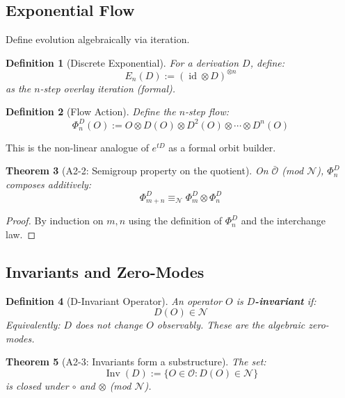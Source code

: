 \documentclass[12pt, oneside]{article}
\newtheorem{theorem}{Theorem}[section]
\newtheorem{definition}[theorem]{Definition}
\DeclareMathOperator{\id}{id}
\DeclareMathOperator{\Inv}{Inv}
\newcommand{\N}{\mathcal{N}}
\newcommand{\Opr}{\mathcal{O}}
\newcommand{\Osh}{\bar{\mathcal{O}}}
\begin{document}
\subsection{Exponential Flow}

Define evolution algebraically via iteration.

\begin{definition}[Discrete Exponential]
For a derivation $D$, define:
\begin{equation}
E_n(D) := (\id \otimes D)^{\otimes n}
\end{equation}
as the $n$-step overlay iteration (formal).
\end{definition}

\begin{definition}[Flow Action]
Define the $n$-step flow:
\begin{equation}
\Phi_n^D(O) := O \otimes D(O) \otimes D^2(O) \otimes \cdots \otimes D^n(O)
\end{equation}
\end{definition}

This is the non-linear analogue of $e^{tD}$ as a formal orbit builder.

\begin{theorem}[A2-2: Semigroup property on the quotient]
On $\Osh$ (mod $\N$), $\Phi_n^D$ composes additively:
\begin{equation}
\Phi_{m+n}^D \equiv_\N \Phi_m^D \otimes \Phi_n^D
\end{equation}
\end{theorem}

\begin{proof}
By induction on $m, n$ using the definition of $\Phi_n^D$ and the interchange law.
\end{proof}

\subsection{Invariants and Zero-Modes}

\begin{definition}[D-Invariant Operator]
An operator $O$ is \textbf{$D$-invariant} if:
\begin{equation}
D(O) \in \N
\end{equation}
Equivalently: $D$ does not change $O$ observably. These are the algebraic zero-modes.
\end{definition}

\begin{theorem}[A2-3: Invariants form a substructure]
The set:
\begin{equation}
\Inv(D) := \{ O \in \Opr : D(O) \in \N \}
\end{equation}
is closed under $\circ$ and $\otimes$ (mod $\N$).
\end{theorem}
\end{document}
